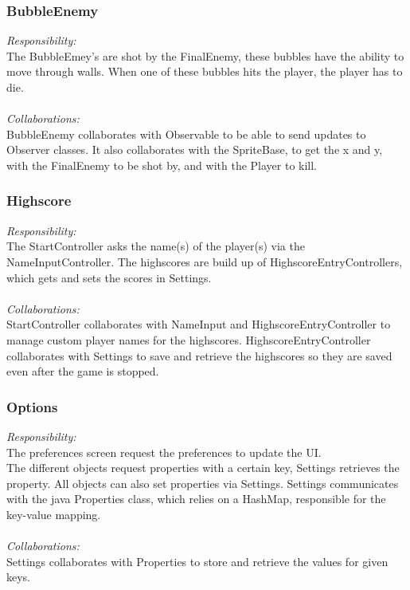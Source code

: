 \subsubsection{BubbleEnemy}
\textit{Responsibility:} \\
The BubbleEmey's are shot by the FinalEnemy, these bubbles have the ability to move through walls. When one of these bubbles hits the player, the player has to die. \\ \\
\textit{Collaborations:} \\
BubbleEnemy collaborates with Observable to be able to send updates to Observer classes. It also collaborates with  the SpriteBase, to get the x and y, with the FinalEnemy to be shot by, and with the Player to kill.

\subsubsection{Highscore}
\textit{Responsibility:} \\
The StartController asks the name(s) of the player(s) via the NameInputController. The highscores are build up of HighscoreEntryControllers, which gets and sets the scores in Settings. \\ \\
\textit{Collaborations:} \\
StartController collaborates with NameInput and HighscoreEntryController to manage custom player names for the highscores. HighscoreEntryController collaborates with Settings to save and retrieve the highscores so they are saved even after the game is stopped.

\subsubsection{Options}
\textit{Responsibility:} \\
The preferences screen request the preferences to update the UI. \\
The different objects request properties with a certain key, Settings retrieves the property. All objects can also set properties via Settings. Settings communicates with the java Properties class, which relies on a HashMap, responsible for the key-value mapping. \\ \\
\textit{Collaborations:} \\
Settings collaborates with Properties to store and retrieve the values for given keys.

